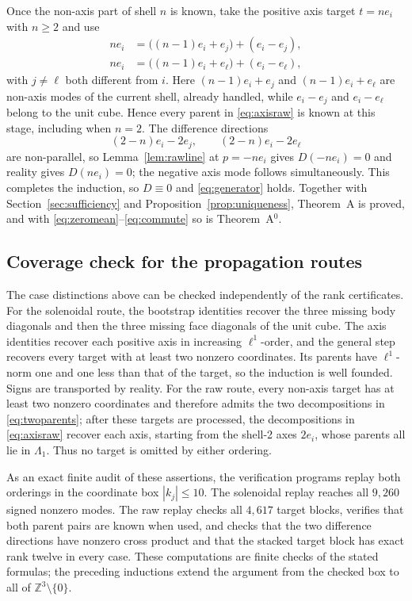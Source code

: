 \documentclass[11pt]{article}
\theoremstyle{definition}
\theoremstyle{remark}
\theoremstyle{plain}
\newcommand{\Z}{\mathbb{Z}}
\begin{document}
Once the non-axis part of shell $n$ is known, take the positive axis target
$t=ne_{i}$ with $n\ge2$ and use
\begin{equation}
\label{eq:axisraw}
\begin{aligned}
ne_{i}&=\bigl((n-1)e_{i}+e_{j}\bigr)+(e_{i}-e_{j}),\\
ne_{i}&=\bigl((n-1)e_{i}+e_{\ell}\bigr)+(e_{i}-e_{\ell}),
\end{aligned}
\end{equation}
with $j\ne\ell$ both different from $i$. Here $(n-1)e_{i}+e_{j}$ and
$(n-1)e_{i}+e_{\ell}$ are non-axis modes of the current shell, already handled,
while $e_{i}-e_{j}$ and $e_{i}-e_{\ell}$ belong to the unit cube. Hence every
parent in \eqref{eq:axisraw} is known at this stage, including when $n=2$. The
difference directions
\[
(2-n)e_{i}-2e_{j},
\qquad
(2-n)e_{i}-2e_{\ell}
\]
are non-parallel, so Lemma~\ref{lem:rawline} at $p=-ne_{i}$ gives
$D(-ne_{i})=0$ and reality gives $D(ne_{i})=0$; the negative axis mode follows
simultaneously. This completes the induction, so $D\equiv0$ and
\eqref{eq:generator} holds. Together with Section~\ref{sec:sufficiency} and
Proposition~\ref{prop:uniqueness}, Theorem~A is proved, and with
\eqref{eq:zeromean}--\eqref{eq:commute} so is Theorem~A$^{0}$.

\subsection{Coverage check for the propagation routes}
\label{subsec:propcheck}

The case distinctions above can be checked independently of the rank
certificates. For the solenoidal route, the bootstrap identities recover the
three missing body diagonals and then the three missing face diagonals of the
unit cube. The axis identities recover each positive axis in increasing
$\ell^{1}$-order, and the general step recovers every target with at least two
nonzero coordinates. Its parents have $\ell^{1}$-norm one and one less than
that of the target, so the induction is well founded. Signs are transported by
reality. For the raw route, every non-axis target has at least two nonzero
coordinates and therefore admits the two decompositions in
\eqref{eq:twoparents}; after these targets are processed, the decompositions in
\eqref{eq:axisraw} recover each axis, starting from the shell-2 axes
$2e_{i}$, whose parents all lie in $\Lambda_{1}$. Thus no target is omitted by either
ordering.

As an exact finite audit of these assertions, the verification programs replay
both orderings in the coordinate box $|k_j|\le10$. The solenoidal replay
reaches all $9{,}260$ signed nonzero modes. The raw replay checks all $4{,}617$
target blocks, verifies that both parent pairs are known when used, and checks
that the two difference directions have nonzero cross product and that the
stacked target block has exact rank twelve in every case. These computations
are finite checks of the stated formulas; the preceding inductions extend the
argument from the checked box to all of $\Z^{3}\setminus\{0\}$.
\end{document}
